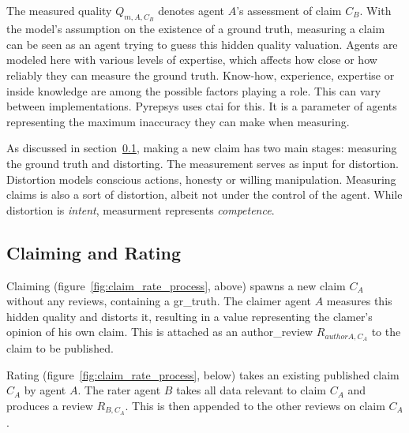 \documentclass[%
    ]{\PathToTumTemplate/thesis/tum_thesis}
\begin{document}
The measured quality $Q_{m,A,C_{B}}$ denotes agent $A$'s assessment of claim $C_B$.
With the model's assumption on the existence of a ground truth, measuring a claim can be seen as an agent trying to guess this hidden quality valuation.
Agents are modeled here with various levels of expertise, which affects how close or how reliably they can measure the ground truth.
Know-how, experience, expertise or inside knowledge are among the possible factors playing a role.
This can vary between implementations.
Pyrepsys uses \acrlong{ctai} for this.
It is a parameter of agents representing the maximum inaccuracy they can make when measuring.

As discussed in section~\ref{sec:appr_claim_rate_process}, making a new claim has two main stages: measuring the ground truth and distorting.
The measurement serves as input for distortion.
Distortion models conscious actions, honesty or willing manipulation.
Measuring claims is also a sort of distortion, albeit not under the control of the agent.
While distortion is \emph{intent}, measurment represents \emph{competence}.


\subsection{Claiming and Rating}\label{sec:appr_claim_rate_process}
Claiming (figure~\ref{fig:claim_rate_process}, above) spawns a new claim $C_A$ without any reviews, containing a \gls{gr_truth}.
The claimer agent $A$ measures this hidden quality and distorts it, resulting in a value representing the clamer's opinion of his own claim.
This is attached as an \gls{author_review} $R_{authorA,C_{A}}$ to the claim to be published.

Rating (figure~\ref{fig:claim_rate_process}, below) takes an existing published claim $C_A$ by agent $A$.
The rater agent $B$ takes all data relevant to claim $C_A$ and produces a \gls{review} $R_{B,C_{A}}$.
This is then appended to the other reviews on claim $C_A$.
\end{document}

